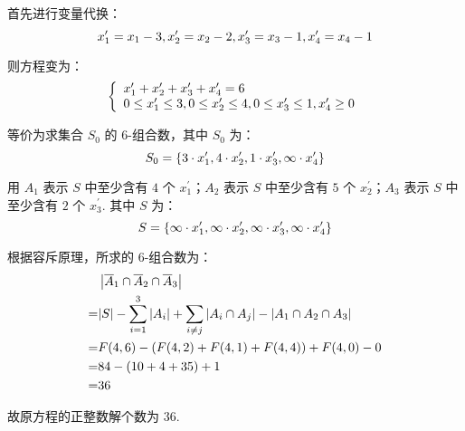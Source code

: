 \documentclass[cn, hazy, blue, normal, 12pt]{elegantnote}
\begin{document}
\begin{solution}[print=true]

    首先进行变量代换：
    \begin{equation}
        \notag
        x_1^{\prime} = x_1-3,
        x_2^{\prime} = x_2-2,
        x_3^{\prime} = x_3-1,
        x_4^{\prime} = x_4-1
    \end{equation}

    则方程变为：
    \begin{equation}
        \notag
        \left\{
        \begin{array}{l}
            x_1^{\prime} + x_2^{\prime} + x_3^{\prime} + x_4^{\prime} = 6 \\
            0 \leq x_1^{\prime} \leq 3,
            0 \leq x_2^{\prime} \leq 4,
            0 \leq x_3^{\prime} \leq 1,
            x_4^{\prime} \geq 0
        \end{array}
        \right.
    \end{equation}

    等价为求集合 $S_0$ 的 $6\text{-}$组合数，其中 $S_0$ 为：
    \begin{equation}
        \notag
        S_0 = \left\{
        3 \cdot x_1^{\prime},
        4 \cdot x_2^{\prime},
        1 \cdot x_3^{\prime},
        \infty \cdot x_4^{\prime}
        \right\}
    \end{equation}

    用 $A_1$ 表示 $S$ 中至少含有 $4$ 个 $x_1^{\prime}$；$A_2$ 表示 $S$ 中至少含有 $5$ 个 $x_2^{\prime}$；$A_3$ 表示 $S$ 中至少含有 $2$ 个 $x_3^{\prime}$. 其中 $S$ 为：
    \begin{equation}
        \notag
        S = \left\{
        \infty \cdot x_1^{\prime},
        \infty \cdot x_2^{\prime},
        \infty \cdot x_3^{\prime},
        \infty \cdot x_4^{\prime}
        \right\}
    \end{equation}

    根据容斥原理，所求的 $6\text{-}$组合数为：
    \begin{equation}
        \notag
        \begin{aligned}
              & \left| \overline{A}_1 \cap
            \overline{A}_2 \cap
            \overline{A}_3 \right|                         \\
            = & |S| -
            \sum_{i=1}^{3}{\left| A_i \right|} +
            \sum_{i \neq j}{\left| A_i \cap A_j \right|} -
            \left| A_1 \cap A_2 \cap A_3 \right|           \\
            = & F(4,6) -
            \left(F(4,2)+F(4,1)+F(4,4)\right) + F(4,0) - 0 \\
            = & 84-(10+4+35)+1                             \\
            = & 36
        \end{aligned}
    \end{equation}

    故原方程的正整数解个数为 $36$.

\end{solution}
\end{document}
